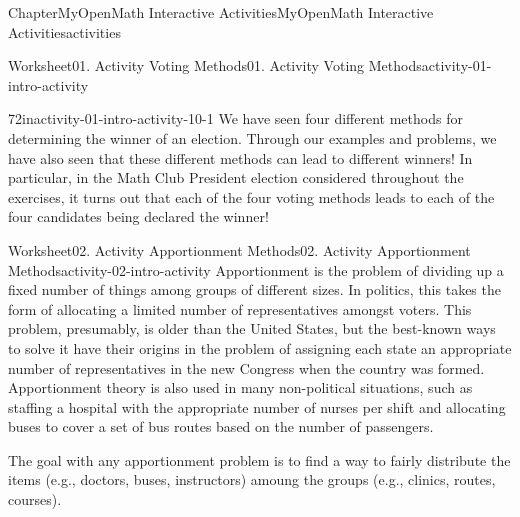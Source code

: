 \documentclass[oneside,10pt,]{book}
\newcommand{\blocktitlefont}{\relax}
\newcommand{\ptxlistdisc}{\raisebox{0.3ex}{\textbullet}}
\newlength{\fillinmaxwidth}
\newlength{\fillincontract}
\newlength{\charmaxwidth}\setlength{\charmaxwidth}{0.5em}
\newlength{\charminwidth}\setlength{\charminwidth}{0.1em}
\newlength{\fillinheight}
\newcommand{\fillintext}[1]{%
\setlength{\fillinmaxwidth}{#1\charmaxwidth}%
\setlength{\fillincontract}{#1\charminwidth}%
\setlength{\fillinheight}{\baselineskip}\addtolength{\fillinheight}{1.2pt}%
\strut\nobreak\leaders\vbox{\hrule width 0.3pt height 0.3pt \vskip -1.2pt}\hskip 1\fillinmaxwidth minus \fillincontract\nobreak\strut%
}
\begin{document}
\begin{chapterptx}{Chapter}{MyOpenMath Interactive Activities}{}{MyOpenMath Interactive Activities}{}{}{activities}
\begin{worksheet-section}{Worksheet}{01. Activity Voting Methods}{}{01. Activity Voting Methods}{}{}{activity-01-intro-activity}
%
\clearpage
\begin{divisionexercise}{7}{}{2in}{activity-01-intro-activity-10-1}%
We have seen four different methods for determining the winner of an election. Through our examples and problems, we have also seen that these different methods can lead to different winners! In particular, in the Math Club President election considered throughout the exercises, it turns out that each of the four voting methods leads to each of the four candidates being declared the winner!%
\end{divisionexercise}%
\end{worksheet-section}
\restoregeometry
%
%
\typeout{************************************************}
\typeout{************************************************}
%
\begin{worksheet-section}{Worksheet}{02. Activity Apportionment Methods}{}{02. Activity Apportionment Methods}{}{}{activity-02-intro-activity}
Apportionment is the problem of dividing up a fixed number of things among groups of different sizes. In politics, this takes the form of allocating a limited number of representatives amongst voters. This problem, presumably, is older than the United States, but the best-known ways to solve it have their origins in the problem of assigning each state an appropriate number of representatives in the new Congress when the country was formed. Apportionment theory is also used in many non-political situations, such as staffing a hospital with the appropriate number of nurses per shift and allocating buses to cover a set of bus routes based on the number of passengers.%
 \par
The goal with any apportionment problem is to find a way to fairly distribute the items (e.g., doctors, buses, instructors) amoung the groups (e.g., clinics, routes, courses).%

\end{worksheet-section}
\end{chapterptx}
\end{document}
